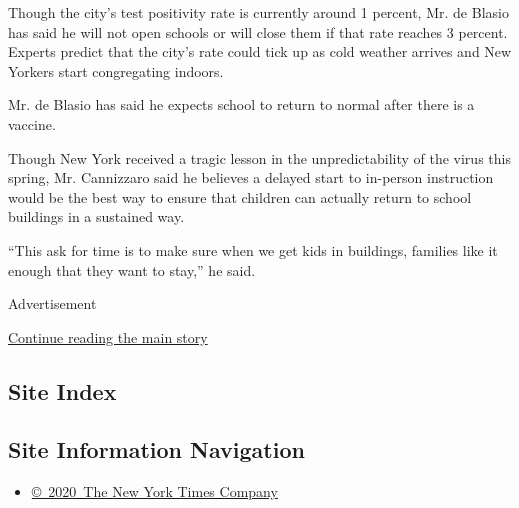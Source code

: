 Though the city's test positivity rate is currently around 1 percent,
Mr. de Blasio has said he will not open schools or will close them if
that rate reaches 3 percent. Experts predict that the city's rate could
tick up as cold weather arrives and New Yorkers start congregating
indoors.

Mr. de Blasio has said he expects school to return to normal after there
is a vaccine.

Though New York received a tragic lesson in the unpredictability of the
virus this spring, Mr. Cannizzaro said he believes a delayed start to
in-person instruction would be the best way to ensure that children can
actually return to school buildings in a sustained way.

``This ask for time is to make sure when we get kids in buildings,
families like it enough that they want to stay,'' he said.

Advertisement

\protect\hyperlink{after-bottom}{Continue reading the main story}

\hypertarget{site-index}{%
\subsection{Site Index}\label{site-index}}

\hypertarget{site-information-navigation}{%
\subsection{Site Information
Navigation}\label{site-information-navigation}}

\begin{itemize}
\tightlist
\item
  \href{https://help.nytimes3xbfgragh.onion/hc/en-us/articles/115014792127-Copyright-notice}{©~2020~The
  New York Times Company}
\end{itemize}

